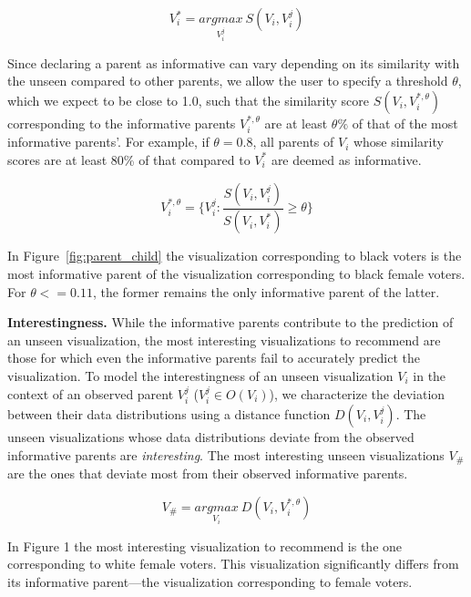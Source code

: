 \begin{equation}
    V_i^*=\underset{V_i^j}{argmax}\ S(V_i, V_i^j)
\end{equation}

Since declaring a parent as informative can vary depending on its similarity with the unseen compared to other parents, we allow the user to specify a threshold $\theta$, which we expect to be close to 1.0, such that the similarity score $S(V_i, V_i^{*, \theta})$ corresponding to the informative parents $V_i^{*, \theta}$ are at least $\theta\%$ of that of the most informative parents'. For example, if $\theta = 0.8$, all parents of $V_i$ whose similarity scores are at least 80\% of that compared to $V_i^*$ are deemed as informative.

\begin{equation}
    V_i^{*, \theta} = \{V_i^j : \frac{S(V_i, V_i^j)}{S(V_i, V_i^*)} \ge \theta\}
\end{equation}

In Figure~\ref{fig:parent_child} the visualization corresponding to black voters is the most informative parent of the visualization corresponding to black female voters. For $\theta <= 0.11$, the former remains the only informative parent of the latter.

\textbf{Interestingness.} While the informative parents contribute to the prediction of an unseen visualization, the most interesting visualizations to recommend are those for which even the informative parents fail to accurately predict the visualization. To model the interestingness of an unseen visualization $V_i$ in the context of an observed parent $V_i^j$ ($V_i^j \in O(V_i)$), we characterize the deviation between their data distributions using a distance function $D(V_i, V_i^j)$. The unseen visualizations whose data distributions deviate from the observed informative parents are \emph{interesting}. The most interesting unseen visualizations $V_\#$ are the ones that deviate most from their observed informative parents. 


\begin{equation}
    V_\#=\underset{V_i}{argmax} \ D(V_i, V_i^{*, \theta})
\end{equation}

In Figure 1 the most interesting visualization to recommend is the one corresponding to white female voters. This visualization significantly differs from its informative parent---the visualization corresponding to female voters.


